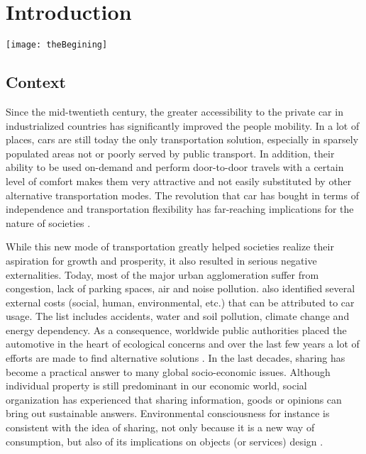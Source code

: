 \chapter{Introduction} \label{chap:introduction}
\minitoc
\vspace{5cm}
%
\noindent
\begin{minipage}[c]{\textwidth}
\centering
\texttt{[image: theBegining]}
\end{minipage}

\newpage
\section{Context}
Since the mid-twentieth century, the greater accessibility to the private car in industrialized countries has significantly improved the people mobility.
In a lot of places, cars are still today the only transportation solution, especially in sparsely populated areas not or poorly served by public transport.
In addition, their ability to be used on-demand and perform door-to-door travels with a certain level of comfort makes them very attractive and not easily substituted by other alternative transportation modes.
The revolution that car has bought in terms of independence and transportation flexibility has far-reaching implications for the nature of societies \cite{jakle_lots_2004}.

\medskip
While this new mode of transportation greatly helped societies realize their aspiration for growth and prosperity, it also resulted in serious negative externalities.
Today, most of the major urban agglomeration suffer from congestion, lack of parking spaces, air and noise pollution.
\cite{maibach_handbook_2007} also identified several external costs (social, human, environmental, etc.) that can be attributed to car usage.
The list includes accidents, water and soil pollution, climate change and energy dependency.
As a consequence, worldwide public authorities placed the automotive in the heart of ecological concerns and over the last few years a lot of efforts are made to find alternative solutions \cite{mitchell_reinventing_2010}.
In the last decades, sharing has become a practical answer to many global socio-economic issues.
Although individual property is still predominant in our economic world, social organization has experienced that sharing information, goods or opinions can bring out sustainable answers.
Environmental consciousness for instance is consistent with the idea of sharing, not only because it is a new way of consumption, but also of its implications on objects (or services) design \cite{ciari_sharing_2012}.

